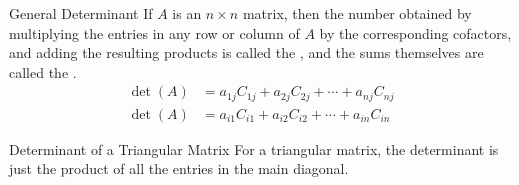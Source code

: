 \documentclass[\main/notes.tex]{subfiles}
\begin{document}
			\begin{definition}{General Determinant}
				If $A$ is an $n \times n$ matrix, then the number obtained by multiplying the entries in any row or column of $A$ by the corresponding cofactors, and adding the resulting products is called the , and the sums themselves are called the .
				\begin{align*}
					\det(A) &= a_{1j}C_{1j} + a_{2j}C_{2j} + \cdots + a_{nj}C_{nj}\\
					\det(A) &= a_{i1}C_{i1} + a_{i2}C_{i2} + \cdots + a_{in}C_{in}
				\end{align*}
			\end{definition}
			\begin{sidenote}{Determinant of a Triangular Matrix}
				For a triangular matrix, the determinant is just the product of all the entries in the main diagonal.
			\end{sidenote}
\end{document}
